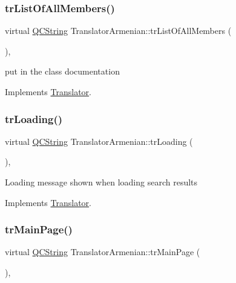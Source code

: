 \subsubsection{\texorpdfstring{trListOfAllMembers()}{trListOfAllMembers()}}
{\footnotesize\ttfamily virtual \mbox{\hyperlink{class_q_c_string}{Q\+C\+String}} Translator\+Armenian\+::tr\+List\+Of\+All\+Members (\begin{DoxyParamCaption}{ }\end{DoxyParamCaption})\hspace{0.3cm}{\ttfamily [inline]}, {\ttfamily [virtual]}}

put in the class documentation 

Implements \mbox{\hyperlink{class_translator}{Translator}}.

\mbox{\label{class_translator_armenian_af75078cf1f25d5e91c79a9ab62ea1ac6}} 
\subsubsection{\texorpdfstring{trLoading()}{trLoading()}}
{\footnotesize\ttfamily virtual \mbox{\hyperlink{class_q_c_string}{Q\+C\+String}} Translator\+Armenian\+::tr\+Loading (\begin{DoxyParamCaption}{ }\end{DoxyParamCaption})\hspace{0.3cm}{\ttfamily [inline]}, {\ttfamily [virtual]}}

Loading message shown when loading search results 

Implements \mbox{\hyperlink{class_translator}{Translator}}.

\mbox{\label{class_translator_armenian_a2ac8737df8db686eed135ad5bb091395}} 
\subsubsection{\texorpdfstring{trMainPage()}{trMainPage()}}
{\footnotesize\ttfamily virtual \mbox{\hyperlink{class_q_c_string}{Q\+C\+String}} Translator\+Armenian\+::tr\+Main\+Page (\begin{DoxyParamCaption}{ }\end{DoxyParamCaption})\hspace{0.3cm}{\ttfamily [inline]}, {\ttfamily [virtual]}}

